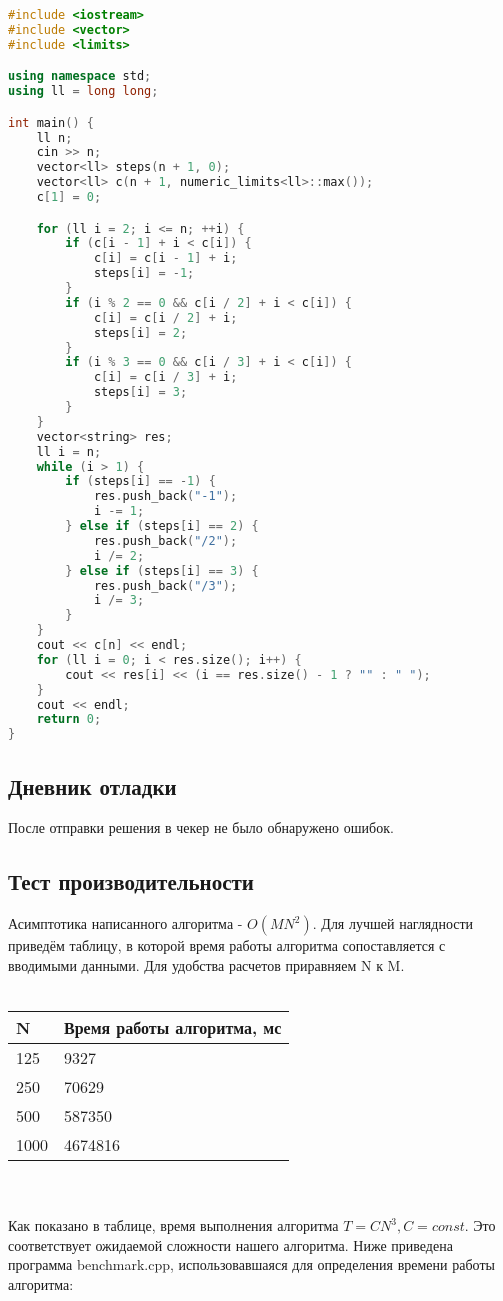\documentclass[12pt]{article}
\begin{document}
\begin{lstlisting}[language=C++]
#include <iostream>
#include <vector>
#include <limits>

using namespace std;
using ll = long long;

int main() {
    ll n;
    cin >> n;
    vector<ll> steps(n + 1, 0);
    vector<ll> c(n + 1, numeric_limits<ll>::max());
    c[1] = 0; 

    for (ll i = 2; i <= n; ++i) {
        if (c[i - 1] + i < c[i]) {
            c[i] = c[i - 1] + i;
            steps[i] = -1;
        }
        if (i % 2 == 0 && c[i / 2] + i < c[i]) {
            c[i] = c[i / 2] + i;
            steps[i] = 2;
        }
        if (i % 3 == 0 && c[i / 3] + i < c[i]) {
            c[i] = c[i / 3] + i;
            steps[i] = 3;
        }
    }
    vector<string> res;
    ll i = n;
    while (i > 1) {
        if (steps[i] == -1) {
            res.push_back("-1");
            i -= 1;
        } else if (steps[i] == 2) {
            res.push_back("/2");
            i /= 2;
        } else if (steps[i] == 3) {
            res.push_back("/3");
            i /= 3;
        }
    }
    cout << c[n] << endl;
    for (ll i = 0; i < res.size(); i++) {
        cout << res[i] << (i == res.size() - 1 ? "" : " ");
    }
    cout << endl;
    return 0;
}

\end{lstlisting}

\subsection*{Дневник отладки}

После отправки решения в чекер не было обнаружено ошибок.

\subsection*{Тест производительности}
Асимптотика написанного алгоритма - $O(MN^2)$.
Для лучшей наглядности приведём таблицу, в которой время работы алгоритма сопоставляется с вводимыми данными. Для удобства расчетов приравняем N к M.
\\
\\
\begin{tabularx}{\textwidth}{ |X|X| }
    \hline
    N & Время работы алгоритма, мс \\
    \hline
    125 & 9327 \\
    250 & 70629 \\
    500 & 587350 \\
    1000 & 4674816 \\
    \hline
\end{tabularx}
\\
\\
Как показано в таблице, время выполнения алгоритма $T = CN^3, C = const$. Это соответствует ожидаемой сложности нашего алгоритма. 
Ниже приведена программа benchmark.cpp, использовавшаяся для определения времени работы алгоритма:
\end{document}

